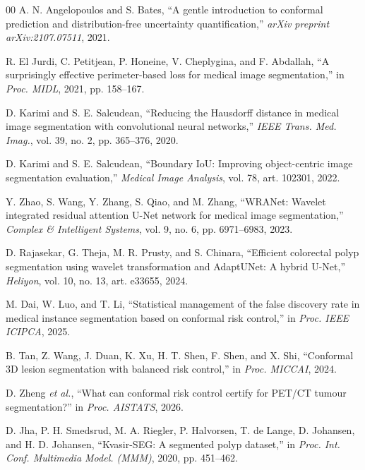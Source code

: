 \documentclass[journal]{IEEEtran}
\begin{document}
\begin{thebibliography}{00}
 A. N. Angelopoulos and S. Bates, ``A gentle introduction to conformal prediction and distribution-free uncertainty quantification,'' \emph{arXiv preprint arXiv:2107.07511}, 2021.

 R. El Jurdi, C. Petitjean, P. Honeine, V. Cheplygina, and F. Abdallah, ``A surprisingly effective perimeter-based loss for medical image segmentation,'' in \emph{Proc. MIDL}, 2021, pp. 158--167.

 D. Karimi and S. E. Salcudean, ``Reducing the Hausdorff distance in medical image segmentation with convolutional neural networks,'' \emph{IEEE Trans. Med. Imag.}, vol. 39, no. 2, pp. 365--376, 2020.

 D. Karimi and S. E. Salcudean, ``Boundary IoU: Improving object-centric image segmentation evaluation,'' \emph{Medical Image Analysis}, vol. 78, art. 102301, 2022.

 Y. Zhao, S. Wang, Y. Zhang, S. Qiao, and M. Zhang, ``WRANet: Wavelet integrated residual attention U-Net network for medical image segmentation,'' \emph{Complex \& Intelligent Systems}, vol. 9, no. 6, pp. 6971--6983, 2023.

 D. Rajasekar, G. Theja, M. R. Prusty, and S. Chinara, ``Efficient colorectal polyp segmentation using wavelet transformation and AdaptUNet: A hybrid U-Net,'' \emph{Heliyon}, vol. 10, no. 13, art. e33655, 2024.

 M. Dai, W. Luo, and T. Li, ``Statistical management of the false discovery rate in medical instance segmentation based on conformal risk control,'' in \emph{Proc. IEEE ICIPCA}, 2025.

 B. Tan, Z. Wang, J. Duan, K. Xu, H. T. Shen, F. Shen, and X. Shi, ``Conformal 3D lesion segmentation with balanced risk control,'' in \emph{Proc. MICCAI}, 2024.

 D. Zheng \emph{et al.}, ``What can conformal risk control certify for PET/CT tumour segmentation?'' in \emph{Proc. AISTATS}, 2026.

 D. Jha, P. H. Smedsrud, M. A. Riegler, P. Halvorsen, T. de Lange, D. Johansen, and H. D. Johansen, ``Kvasir-SEG: A segmented polyp dataset,'' in \emph{Proc. Int. Conf. Multimedia Model. (MMM)}, 2020, pp. 451--462.

\end{thebibliography}
\end{document}

